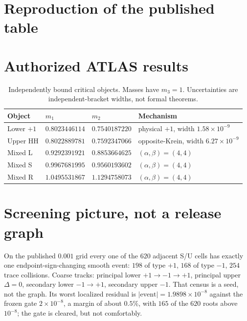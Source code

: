 \documentclass[11pt]{article}
\begin{document}
\section{Reproduction of the published table}

\section{Authorized ATLAS results}

\begin{table}[ht]
\centering
\caption{Independently bound critical objects.
Masses have $m_3=1$.
Uncertainties are independent-bracket widths, not formal theorems.}
\label{tab:bound}
{\small
\begin{tabular}{@{}llll@{}}
\toprule
Object & $m_1$ & $m_2$ & Mechanism \\
\midrule
Lower $+1$ & $0.8023446114$ & $0.7540187220$ & physical $+1$, width $1.58\times10^{-9}$ \\
Upper HH & $0.8022889781$ & $0.7592347066$ & opposite-Krein, width $6.27\times10^{-9}$ \\
Mixed L & $0.9292391921$ & $0.8853664625$ & $(\alpha,\beta)=(4,4)$ \\
Mixed S & $0.9967681995$ & $0.9560193602$ & $(\alpha,\beta)=(4,4)$ \\
Mixed R & $1.0495531867$ & $1.1294758073$ & $(\alpha,\beta)=(4,4)$ \\
\bottomrule
\end{tabular}}
\end{table}

\section{Screening picture, not a release graph}

On the published $0.001$ grid every one of the $620$ adjacent S/U cells has
exactly one endpoint-sign-changing smooth event:
$198$ of type $+1$, $168$ of type $-1$, $254$ trace collisions.
Coarse tracks:
principal lower $+1\to-1\to+1$,
principal upper $\Delta=0$,
secondary lower $-1\to+1$,
secondary upper $-1$.
That census is a seed, not the graph.
Its worst localized residual is $\lvert\text{event}\rvert=1.9898\times10^{-8}$
against the frozen gate $2\times10^{-8}$, a margin of about $0.5\%$, with $165$
of the $620$ roots above $10^{-8}$; the gate is cleared, but not comfortably.
\end{document}
